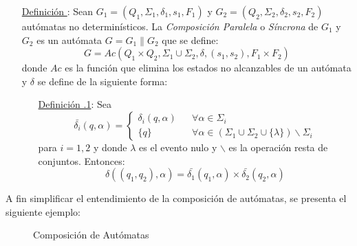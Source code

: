 \begin{itemize}
  \item [\underline{Definición \thedefinitionsCounter}:] Sean $G_{1} = (Q_{1}, \Sigma_{1},
  \delta_{1}, s_{1}, F_{1})$ y $G_{2} = (Q_{2}, \Sigma_{2}, \delta_{2}, s_{2},
  F_{2})$ autómatas no determinísticos. La \textit{Composición Paralela} o
  \textit{Síncrona} de $G_{1}$ y $G_{2}$ es un autómata $G = G_{1} \parallel
  G_{2}$ que se define:
  $$ G = Ac(Q_{1} \times Q_{2}, \Sigma_{1} \cup \Sigma_{2}, \delta, (s_{1},
  s_{2}), F_{1} \times F_{2}) $$ donde $Ac$ es la función que elimina los estados no
 alcanzables de un autómata y $ \delta $ se define de la siguiente forma:
 \begin{itemize}
  \item [\underline{Definición \thedefinitionsCounter.1}:] Sea
   $$ \bar{\delta_{i}}(q,\alpha) =
   \left\{ 
     \begin{array}{lll}
      \delta_{i}(q, \alpha) & & \forall \alpha \in \Sigma_{i} \\
      \{q\} & & \forall \alpha \in (\Sigma_{1} \cup \Sigma_{2} \cup \{\lambda\})
      \backslash \Sigma_{i}
     \end{array}
   \right. $$
   para $i = 1,2$ y donde $\lambda$ es el evento nulo y $\backslash$ es la
   operación resta de conjuntos.
   Entonces: $$ \delta((q_{1},
   q_{2}), \alpha) = \bar{\delta_{1}}(q_{1}, \alpha) \times \bar{\delta_{2}}(q_{2}, \alpha) $$
 \end{itemize}
\end{itemize}

A fin simplificar el entendimiento de la composición de autómatas, se presenta
el siguiente ejemplo:

\begin{figure}[h]
  \centering
  \caption{Composición de Autómatas}
  \label{fig:composicion_automatas}
\end{figure}

